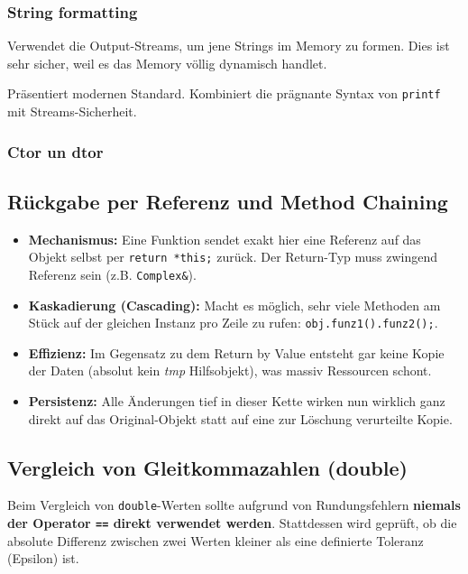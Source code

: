 \subsubsection{String formatting}
Verwendet die Output-Streams, um jene Strings im Memory zu formen. Dies ist sehr sicher, weil es das Memory völlig dynamisch handlet.



Präsentiert modernen Standard. Kombiniert die prägnante Syntax von \texttt{printf} mit Streams-Sicherheit. 


\subsubsection{Ctor un dtor}


\subsection{Rückgabe per Referenz und Method Chaining}
\begin{itemize}
    \item \textbf{Mechanismus:} Eine Funktion sendet exakt hier eine Referenz auf das Objekt selbst per \texttt{return *this;} zurück. Der Return-Typ muss zwingend Referenz sein (z.B. \texttt{Complex\&}).
    \item \textbf{Kaskadierung (Cascading):} Macht es möglich, sehr viele Methoden am Stück auf der gleichen Instanz pro Zeile zu rufen: \texttt{obj.funz1().funz2();}.
    \item \textbf{Effizienz:} Im Gegensatz zu dem Return by Value entsteht gar keine Kopie der Daten (absolut kein \textit{tmp} Hilfsobjekt), was massiv Ressourcen schont.
    \item \textbf{Persistenz:} Alle Änderungen tief in dieser Kette wirken nun wirklich ganz direkt auf das Original-Objekt statt auf eine zur Löschung verurteilte Kopie.
\end{itemize}



\subsection{Vergleich von Gleitkommazahlen (double)}
Beim Vergleich von \texttt{double}-Werten sollte aufgrund von Rundungsfehlern \textbf{niemals 
der Operator \texttt{==} direkt verwendet werden}. 
Stattdessen wird geprüft, ob die absolute Differenz zwischen zwei Werten kleiner als eine definierte Toleranz 
(Epsilon) ist.\smallskip


